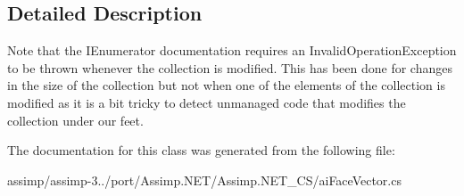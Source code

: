 \subsection{Detailed Description}
Note that the I\+Enumerator documentation requires an Invalid\+Operation\+Exception to be thrown whenever the collection is modified. This has been done for changes in the size of the collection but not when one of the elements of the collection is modified as it is a bit tricky to detect unmanaged code that modifies the collection under our feet. 

The documentation for this class was generated from the following file\+:\begin{DoxyCompactItemize}
\item 
assimp/assimp-\/3../port/\+Assimp.\+N\+E\+T/\+Assimp.\+N\+E\+T\+\_\+\+C\+S/ai\+Face\+Vector.\+cs\end{DoxyCompactItemize}

